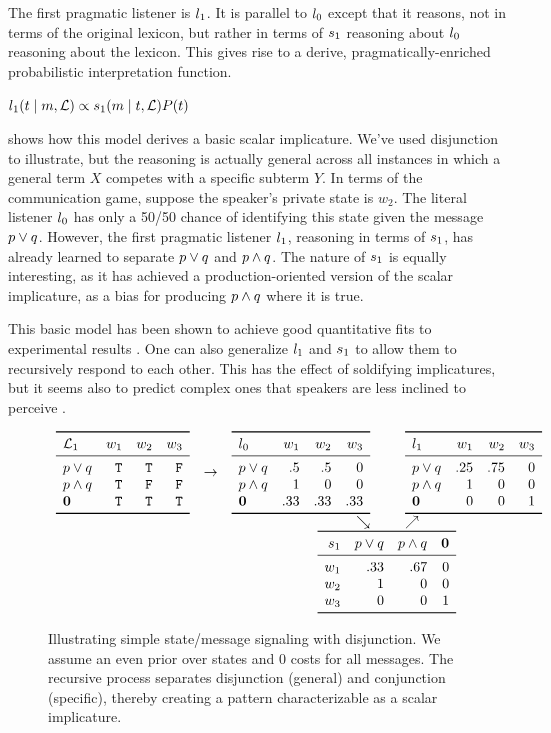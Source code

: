 \documentclass{article}
\begin{document}
The first pragmatic listener is $l_{1}$. It is parallel to
$l_{0}$ except that it reasons, not in terms of the original
lexicon, but rather in terms of $s_{1}$ reasoning about
$l_{0}$ reasoning about the lexicon. This gives rise to a
derive, pragmatically-enriched probabilistic interpretation function.
%
\begin{examples}
\item\label{l1}%
  $l_{1}(t \mid m, \mathcal{L}) \propto 
  s_{1}(m \mid t, \mathcal{L})
  P(t)$
\end{examples}

 shows how this model derives a basic scalar
implicature. We've used disjunction to illustrate, but the reasoning
is actually general across all instances in which a general term $X$
competes with a specific subterm $Y$. In terms of the communication
game, suppose the speaker's private state is $w_{2}$. The literal
listener $l_{0}$ has only a 50/50 chance of identifying this
state given the message $p \vee q$.  However, the first pragmatic
listener $l_{1}$, reasoning in terms of $s_{1}$, has
already learned to separate $p \vee q$ and $p \wedge q$. The nature of
$s_{1}$ is equally interesting, as it has achieved a
production-oriented version of the scalar implicature, as a bias for
producing $p \wedge q$ where it is true.

This basic model has been shown to achieve good quantitative fits to
experimental results
\citep{Degen:Franke:2012,Stiller:Goodman:Frank:2011}. One can also
generalize $l_{1}$ and $s_{1}$ to allow them to
recursively respond to each other. This has the effect of soldifying
implicatures, but it seems also to predict complex ones that speakers
are less inclined to perceive \citep{Vogel-etal:2014}.

\begin{figure}[tp]
  \centering
  \setlength{\arraycolsep}{3pt} 
  $\begin{array}[b]{c c r@{\hspace{25pt}}l}
     \listenerMatrix%
     {\Lex_{1}}%
     {\True & \True  & \False}
     {\True & \False & \False}     
     {\True & \True  & \True}      
     &
     \rightarrow
     &
     \listenerMatrix%
     {\listenerZero}%
     { .5  &  .5 & 0}%
     {  1 &   0 &  0}%
     {.33 & .33 & .33}%
     &
     \listenerMatrix%
     {\listenerOne}%
     {.25 & .75 & 0}%
     {1 &   0 & 0}%
     { 0 &   0 & 1}
   \\
   && \searrow & \nearrow
   \\
   &&
   \multicolumn{2}{c}{
      \speakerMatrix%
      {\speakerOne}%
      {.33 & .67 & 0}%
      {1 &   0 & 0}%
      {0 &   0 & 1}
   }
   \end{array}$   
   \caption{Illustrating simple state/message signaling with
     disjunction.  We assume an even prior over states and $0$ costs
     for all messages. The recursive process separates disjunction
     (general) and conjunction (specific), thereby creating a pattern
     characterizable as a scalar implicature.}
  \label{fig:rsa-disj}
\end{figure}
\end{document}
